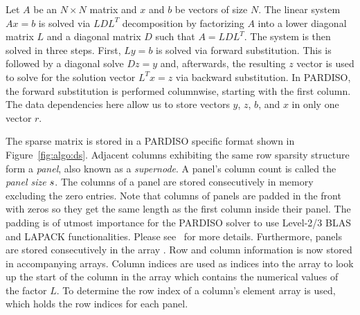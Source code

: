\label{sec:algo}

Let $A$ be an $N \times N$ matrix and $x$ and $b$ be vectors of size $N$.
The linear system $A x = b$ is solved via $LDL^T$ decomposition by factorizing $A$
into a lower diagonal matrix $L$ and a diagonal matrix $D$ 
such
that $A =
LDL^T$.
The system is then solved in three steps. First,
$
  \label{eq:fw}
  Ly=b
$
is solved via forward substitution. This is followed by a diagonal solve
$
  \label{eq:dg}
  Dz=y
$
and, afterwards, the resulting $z$ vector is used to solve for the solution vector
%
$
  \label{eq:bw}
  L^Tx=z
$
% 
via backward substitution. In 
PARDISO, 
the forward substitution is performed columnwise, starting with the
first column.
The data dependencies here allow us to store vectors $y$, $z$, $b$, and $x$ in
only one vector $r$. 


The sparse matrix is stored in a PARDISO specific format shown in
Figure~\ref{fig:algo:ds}.
Adjacent columns exhibiting the same row sparsity structure form a
\textit{panel}, also known as a \textit{supernode}.
A panel's column count is called the \textit{panel size} $s$.
The columns of a panel are stored consecutively in memory excluding the zero
entries. 
Note that columns of panels are padded in the front with zeros so they get the 
same length as the first column inside their panel. 
The padding is of utmost importance for the PARDISO solver to use Level-2/3
BLAS and LAPACK functionalities. Please see~\cite{Bollhofer2020} for more
details.
Furthermore, panels are stored consecutively in the array \vlnz{}.
Row and column information is now stored in accompanying arrays.
Column indices are used as indices into the array \vxlnz{} to look up the
start of
the column in the array \vlnz{} which contains the numerical values of the factor $L$.
To determine the row index of a column's element array \vindx{} is
used, which holds the row indices for each panel.

